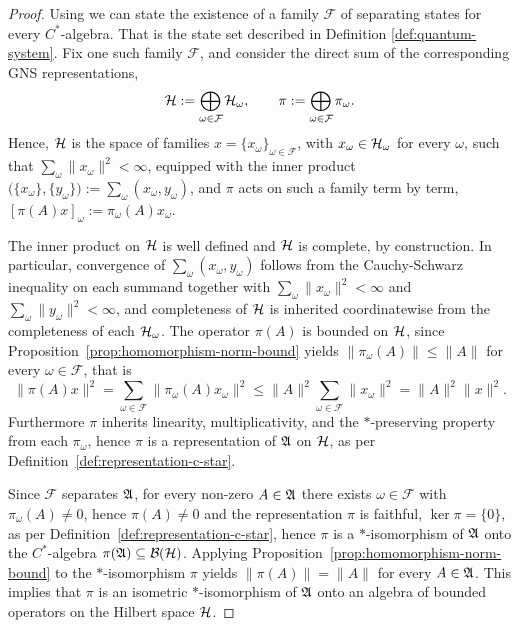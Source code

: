 \begin{proof}
	Using \cite[Prop.~1.6.5, Appendix~C]{strocchiIntroductionMathematicalStructure2005} we can state the existence of a family $\mathcal F$ of separating states for every $C^*$-algebra. That is the state set described in Definition \ref{def:quantum-system}. Fix one such family $\mathcal F$, and consider the direct sum of the corresponding GNS representations,
	\begin{equation}
		\H := \bigoplus_{\omega \in \mathcal F} \H_\omega, \qquad \pi := \bigoplus_{\omega \in \mathcal F} \pi_\omega.
	\end{equation}
	Hence, $\H$ is the space of families $x=\{x_\omega\}_{\omega\in\mathcal F}$, with $x_\omega \in \H_\omega$ for every $\omega$, such that $\sum_\omega \|x_\omega\|^2 < \infty$, equipped with the inner product $\big(\{x_\omega\},\{y_\omega\}\big) := \sum_\omega (x_\omega,y_\omega)$, and $\pi$ acts on such a family term by term, $[\pi(A)x]_\omega := \pi_\omega(A)x_\omega$.
	
	The inner product on $\H$ is well defined and $\H$ is complete, by construction. In particular, convergence of $\sum_\omega (x_\omega,y_\omega)$ follows from the Cauchy-Schwarz inequality on each summand together with $\sum_\omega\|x_\omega\|^2<\infty$ and $\sum_\omega\|y_\omega\|^2<\infty$, and completeness of $\H$ is inherited coordinatewise from the completeness of each $\H_\omega$. The operator $\pi(A)$ is bounded on $\H$, since Proposition~\ref{prop:homomorphism-norm-bound} yields $\|\pi_\omega(A)\| \le \|A\|$ for every $\omega \in \mathcal F$, that is
	\begin{equation}
		\|\pi(A)x\|^2 = \sum_{\omega\in\mathcal F} \|\pi_\omega(A)x_\omega\|^2 \le \|A\|^2 \sum_{\omega\in\mathcal F}\|x_\omega\|^2 = \|A\|^2\|x\|^2.
	\end{equation}
	Furthermore $\pi$ inherits linearity, multiplicativity, and the $*$-preserving property from each $\pi_\omega$, hence $\pi$ is a representation of $\mathfrak{A}$ on $\H$, as per Definition~\ref{def:representation-c-star}.
	
	Since $\mathcal F$ separates $\mathfrak{A}$, for every non-zero $A \in \mathfrak{A}$ there exists $\omega \in \mathcal F$ with $\pi_\omega(A) \neq 0$, hence $\pi(A) \neq 0$ and the representation $\pi$ is faithful, $\ker\pi = \{0\}$, as per Definition~\ref{def:representation-c-star}, hence $\pi$ is a $*$-isomorphism of $\mathfrak{A}$ onto the $C^*$-algebra $\pi(\A) \subseteq \mathcal{B}(\H)$. Applying Proposition~\ref{prop:homomorphism-norm-bound} to the $*$-isomorphism $\pi$ yields $\|\pi(A)\| = \|A\|$ for every $A \in \mathfrak{A}$. This implies that $\pi$ is an isometric $*$-isomorphism of $\mathfrak{A}$ onto an algebra of bounded operators on the Hilbert space $\H$.
\end{proof}

